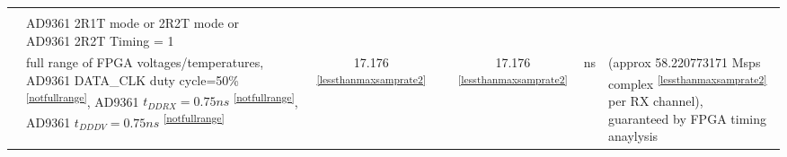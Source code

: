 \documentclass{article}
\begin{document}
\begin{scriptsize}
\begin{longtable}{|c|l|c|c|c|c|l|}
                          &                                      &                                & &                                &                      & \\
                          & \multirow{2}{*}{\parbox{6.7 cm}{\hspace*{12mm}AD9361 2R1T mode or 2R2T mode or \\ \hspace*{12mm}AD9361 2R2T Timing = 1}} & & & & & \\
                          &                                      &                                & &                                &                      & \\
                          & \multirow{5}{*}{\parbox{6.7cm}{\hspace*{15mm}full range of FPGA voltages/temperatures,\\ \hspace*{15mm}AD9361 DATA\_CLK duty cycle=50\% \textsuperscript{\ref{notfullrange}}, \\ \hspace*{15mm}AD9361 $t_{DDRX}=0.75 ns$ \textsuperscript{\ref{notfullrange}}, \\ \hspace*{15mm}AD9361 $t_{DDDV}=0.75ns$ \textsuperscript{\ref{notfullrange}} }} & \multirow{5}{*}{17.176 \textsuperscript{\ref{lessthanmaxsamprate2}}}  & & \multirow{5}{*}{17.176 \textsuperscript{\ref{lessthanmaxsamprate2}}} & \multirow{5}{*}{ns} & \multirow{5}{*}{\parbox{3.0cm}{(approx 58.220773171 Msps complex \textsuperscript{\ref{lessthanmaxsamprate2}} per RX channel), \\ guaranteed by FPGA timing anaylysis}} \\
                          &                                      &                                & &                                &                      & \\
                          &                                      &                                & &                                &                      & \\
                          &                                      &                                & &                                &                      & \\
                          &                                      &                                & &                                &                      & \\
    \cline{2-7}

\end{longtable}
\end{scriptsize}
\end{document}
